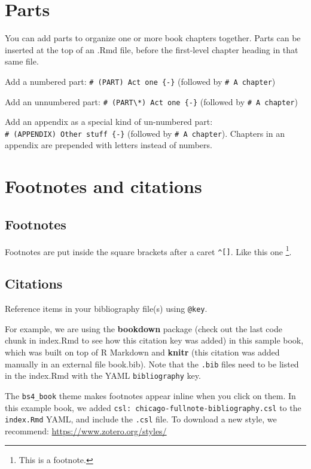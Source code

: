 \documentclass[
]{book}
\theoremstyle{definition}
\theoremstyle{definition}
\theoremstyle{definition}
\theoremstyle{definition}
\theoremstyle{remark}
\begin{document}
\hypertarget{parts}{%
\chapter{Parts}\label{parts}}

You can add parts to organize one or more book chapters together. Parts can be inserted at the top of an .Rmd file, before the first-level chapter heading in that same file.

Add a numbered part: \texttt{\#\ (PART)\ Act\ one\ \{-\}} (followed by \texttt{\#\ A\ chapter})

Add an unnumbered part: \texttt{\#\ (PART\textbackslash{}*)\ Act\ one\ \{-\}} (followed by \texttt{\#\ A\ chapter})

Add an appendix as a special kind of un-numbered part: \texttt{\#\ (APPENDIX)\ Other\ stuff\ \{-\}} (followed by \texttt{\#\ A\ chapter}). Chapters in an appendix are prepended with letters instead of numbers.

\hypertarget{footnotes-and-citations}{%
\chapter{Footnotes and citations}\label{footnotes-and-citations}}

\hypertarget{footnotes}{%
\section{Footnotes}\label{footnotes}}

Footnotes are put inside the square brackets after a caret \texttt{\^{}{[}{]}}. Like this one \footnote{This is a footnote.}.

\hypertarget{citations}{%
\section{Citations}\label{citations}}

Reference items in your bibliography file(s) using \texttt{@key}.

For example, we are using the \textbf{bookdown} package \citep{R-bookdown} (check out the last code chunk in index.Rmd to see how this citation key was added) in this sample book, which was built on top of R Markdown and \textbf{knitr} \citep{xie2015} (this citation was added manually in an external file book.bib).
Note that the \texttt{.bib} files need to be listed in the index.Rmd with the YAML \texttt{bibliography} key.

The \texttt{bs4\_book} theme makes footnotes appear inline when you click on them. In this example book, we added \texttt{csl:\ chicago-fullnote-bibliography.csl} to the \texttt{index.Rmd} YAML, and include the \texttt{.csl} file. To download a new style, we recommend: \url{https://www.zotero.org/styles/}
\end{document}
